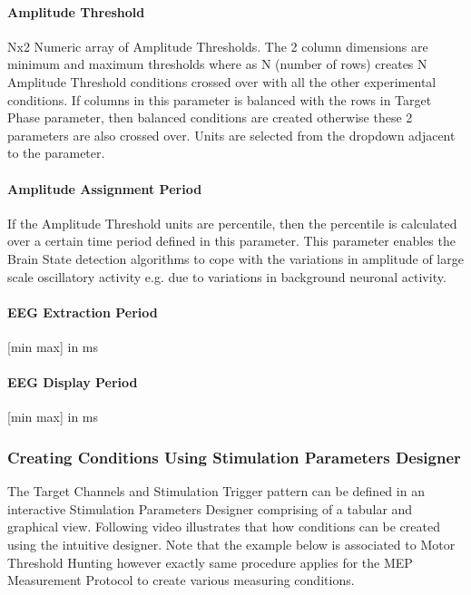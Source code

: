 \documentclass[letterpaper,10pt,english]{sphinxmanual}
\begin{document}
\paragraph{Amplitude Threshold}
\label{\detokenize{11_TEPMeasurement:amplitude-threshold}}
\sphinxAtStartPar
Nx2 Numeric array of Amplitude Thresholds. The 2 column dimensions are minimum and maximum thresholds where as N (number of rows) creates N Amplitude Threshold conditions crossed over with all the other experimental conditions. If columns in this parameter is balanced with the rows in Target Phase parameter, then balanced conditions are created otherwise these 2 parameters are also crossed over. Units are selected from the drop\sphinxhyphen{}down adjacent to the parameter.


\paragraph{Amplitude Assignment Period}
\label{\detokenize{11_TEPMeasurement:amplitude-assignment-period}}
\sphinxAtStartPar
If the Amplitude Threshold units are percentile, then the percentile is calculated over a certain time period defined in this parameter. This parameter enables the Brain State detection algorithms to cope with the variations in amplitude of large scale oscillatory activity e.g. due to variations in background neuronal activity.


\paragraph{EEG Extraction Period}
\label{\detokenize{11_TEPMeasurement:id1}}
\sphinxAtStartPar
{[}min max{]} in ms


\paragraph{EEG Display Period}
\label{\detokenize{11_TEPMeasurement:id2}}
\sphinxAtStartPar
{[}min max{]} in ms


\subsubsection{Creating Conditions Using Stimulation Parameters Designer}
\label{\detokenize{11_TEPMeasurement:creating-conditions-using-stimulation-parameters-designer}}
\sphinxAtStartPar
The Target Channels and Stimulation Trigger pattern can be defined in an interactive Stimulation Parameters Designer comprising of a tabular and graphical view. Following video illustrates that how conditions can be created using the intuitive designer. Note that the example below is associated to Motor Threshold Hunting however exactly same procedure applies for the MEP Measurement Protocol to create various measuring conditions.
\end{document}
